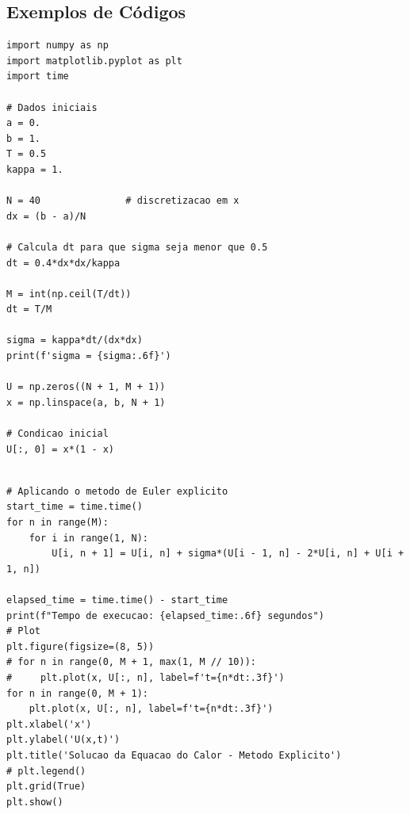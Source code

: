 \documentclass[../differential_methods.tex]{subfiles}
\begin{document}
\subsection{Exemplos de Códigos}

\begin{listing}[H]
	\begin{verbatim}
import numpy as np
import matplotlib.pyplot as plt
import time

# Dados iniciais
a = 0.
b = 1.
T = 0.5
kappa = 1.

N = 40               # discretizacao em x
dx = (b - a)/N

# Calcula dt para que sigma seja menor que 0.5
dt = 0.4*dx*dx/kappa

M = int(np.ceil(T/dt))
dt = T/M

sigma = kappa*dt/(dx*dx)
print(f'sigma = {sigma:.6f}')

U = np.zeros((N + 1, M + 1))
x = np.linspace(a, b, N + 1)

# Condicao inicial
U[:, 0] = x*(1 - x)


\end{verbatim}
	\caption{Implementação do Parabólico Explícito}
\end{listing}
\pagebreak
\begin{verbatim}
# Aplicando o metodo de Euler explicito
start_time = time.time()
for n in range(M):
    for i in range(1, N):
        U[i, n + 1] = U[i, n] + sigma*(U[i - 1, n] - 2*U[i, n] + U[i + 1, n])

elapsed_time = time.time() - start_time
print(f"Tempo de execucao: {elapsed_time:.6f} segundos")
# Plot
plt.figure(figsize=(8, 5))
# for n in range(0, M + 1, max(1, M // 10)):
#     plt.plot(x, U[:, n], label=f't={n*dt:.3f}')
for n in range(0, M + 1):
    plt.plot(x, U[:, n], label=f't={n*dt:.3f}')
plt.xlabel('x')
plt.ylabel('U(x,t)')
plt.title('Solucao da Equacao do Calor - Metodo Explicito')
# plt.legend()
plt.grid(True)
plt.show()
\end{verbatim}
\end{document}

